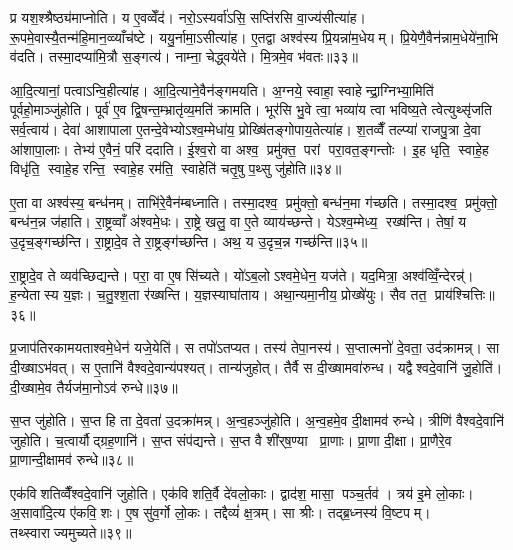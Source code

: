 प्र यश॒श्श्रैष्ठ्य॑माप्नोति। य ए॒वव्वेँद॑। नरो॒ऽस्यर्वा॑ऽसि॒ सप्ति॑रसि वा॒ज्य॑सीत्या॑ह। रू॒पमे॒वास्यै॒तन्म॑हि॒मान॒व्व्याँच॑ष्टे। ययु॒र्नामा॒ऽसीत्या॑ह। ए॒तद्वा अश्व॑स्य प्रि॒यन्ना॑म॒धेयम्। प्रि॒येणै॒वैन॑न्नाम॒धेये॑ना॒भि व॑दति। तस्मा॒दप्या॑मि॒त्रौ स॒ङ्गत्य॑। नाम्ना॒ चेद्ध्वये॑ते। मि॒त्रमे॒व भ॑वतः॥३३॥

आ॒दि॒त्यानां॒ पत्वाऽन्वि॒हीत्या॑ह। आ॒दि॒त्याने॒वैन॑ङ्गमयति। अ॒ग्नये॒ स्वाहा॒ स्वाहेन्द्रा॒ग्निभ्या॒मिति॑ पूर्वहो॒माञ्जु॑होति। पूर्व॑ ए॒व द्वि॒षन्त॒म्भ्रातृ॑व्य॒मति॑ क्रामति। भूर॑सि भु॒वे त्वा॒ भव्या॑य त्वा भविष्य॒ते त्वेत्युथ्सृ॑जति सर्व॒त्वाय॑। देवा॑ आशापाला ए॒तन्दे॒वेभ्योऽश्व॒म्मेधा॑य॒ प्रोख्षि॑तङ्गोपाय॒तेत्या॑ह। श॒तव्वैँ तल्प्या॑ राजपु॒त्रा दे॒वा आ॑शापा॒लाः। तेभ्य॑ ए॒वैनं॒ परि॑ ददाति। ई॒श्व॒रो वा अश्व॒ प्रमु॑क्त॒ परां परा॒वत॒ङ्गन्तोः। इ॒ह धृति॒ स्वाहे॒ह विधृ॑ति॒ स्वाहे॒ह रन्ति॒ स्वाहे॒ह रम॑ति॒ स्वाहेति॑ चतृ॒षु प॒थ्सु जु॑होति॥३४॥

ए॒ता वा अश्व॑स्य॒ बन्ध॑नम्। ताभि॑रे॒वैन॑म्बध्नाति। तस्मा॒दश्व॒ प्रमु॑क्तो॒ बन्ध॑न॒मा ग॑च्छति। तस्मा॒दश्व॒ प्रमु॑क्तो॒ बन्ध॑न॒न्न ज॑हाति। रा॒ष्ट्रव्वाँ अ॑श्वमे॒धः। रा॒ष्ट्रे खलु॒ वा ए॒ते व्याय॑च्छन्ते। येऽश्व॒म्मेध्य॒ रख्ष॑न्ति। तेषां॒ य उ॒दृच॒ङ्गच्छ॑न्ति। रा॒ष्ट्रादे॒व ते रा॒ष्ट्रङ्ग॑च्छन्ति। अथ॒ य उ॒दृच॒न्न गच्छ॑न्ति॥३५॥

रा॒ष्ट्रादे॒व ते व्यव॑च्छिद्यन्ते। परा॒ वा ए॒ष सि॑च्यते। यो॑ऽब॒लोऽश्वमे॒धेन॒ यज॑ते। यद॒मित्रा॒ अश्व॑व्विँ॒न्देरन्न्॑। ह॒न्येतास्य य॒ज्ञः। च॒तु॒श्श॒ता र॑ख्षन्ति। य॒ज्ञस्याघा॑ताय। अथा॒न्यमा॒नीय॒ प्रोख्षे॑युः। सैव तत॒ प्राय॑श्चित्तिः॥३६॥\anuvakamend[ग॒च्छ॒ति॒ भ॒व॒त॒ प॒थ्सु जु॑होति॒ न गच्छ॑न्ति॒ नव॑ च]

प्र॒जाप॑तिरकामयताश्वमे॒धेन॑ यजे॒येति॑। स तपो॑ऽतप्यत। तस्य॑ तेपा॒नस्य॑। स॒प्तात्मनो॑ दे॒वता॒ उद॑क्रामन्न्। सा दी॒ख्षाऽभ॑वत्। स ए॒तानि॑ वैश्वदे॒वान्य॑पश्यत्। तान्य॑जुहोत्। तैर्वै स दी॒ख्षामवा॑रुन्ध। यद्वैश्वदे॒वानि॑ जु॒होति॑। दी॒ख्षामे॒व तैर्यज॑मा॒नोऽव॑ रुन्धे॥३७॥

स॒प्त जु॑होति। स॒प्त हि ता दे॒वता॑ उ॒दक्रा॑मन्न्। अ॒न्व॒हञ्जु॑होति। अ॒न्व॒हमे॒व दी॒क्षामव॑ रुन्धे। त्रीणि॑ वैश्वदे॒वानि॑ जुहोति। च॒त्वार्यौद्ग्रह॒णानि॑। स॒प्त संप॑द्यन्ते। स॒प्त वै शी॑र्‌ष॒ण्या प्रा॒णाः। प्रा॒णा दी॒क्षा। प्रा॒णैरे॒व प्रा॒णान्दी॒क्षामव॑ रुन्धे॥३८॥

एक॑विशतिव्वैँश्वदे॒वानि॑ जुहोति। एक॑विशति॒र्वै दे॑वलो॒काः। द्वाद॑श॒ मासा॒ पञ्च॒र्तव॑। त्रय॑ इ॒मे लो॒काः। अ॒सावा॑दि॒त्य ए॑कवि॒शः। ए॒ष सु॑व॒र्गो लो॒कः। तद्दैव्यं॑ क्ष॒त्रम्। सा श्रीः। तद्ब्र॒ध्नस्य॑ वि॒ष्टपम्। तथ्स्वाराज्यमुच्यते॥३९॥

